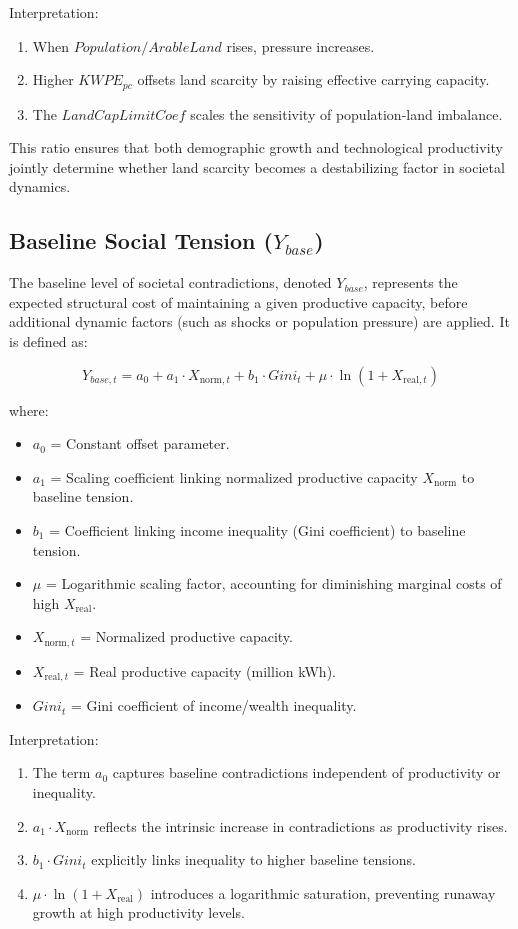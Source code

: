 \documentclass[12pt,a4paper]{article}
\begin{document}
\noindent Interpretation:
\begin{enumerate}
    \item When $Population/ArableLand$ rises, pressure increases.
    \item Higher $KWPE_{pc}$ offsets land scarcity by raising effective carrying capacity.
    \item The $LandCapLimitCoef$ scales the sensitivity of population-land imbalance.
\end{enumerate}

\noindent This ratio ensures that both demographic growth and technological 
productivity jointly determine whether land scarcity becomes a destabilizing 
factor in societal dynamics.
\subsection{Baseline Social Tension (\texorpdfstring{$Y_{base}$}{Ybase})}

The baseline level of societal contradictions, denoted $Y_{base}$, represents 
the expected structural cost of maintaining a given productive capacity, before 
additional dynamic factors (such as shocks or population pressure) are applied. 
It is defined as:

\begin{equation}
Y_{base,t} = a_0 + a_1 \cdot X_{\mathrm{norm},t} + b_1 \cdot Gini_t + \mu \cdot \ln(1 + X_{\mathrm{real},t})
\end{equation}

\noindent where:
\begin{itemize}
    \item $a_0$ = Constant offset parameter.
    \item $a_1$ = Scaling coefficient linking normalized productive capacity $X_{\mathrm{norm}}$ to baseline tension.
    \item $b_1$ = Coefficient linking income inequality (Gini coefficient) to baseline tension.
    \item $\mu$ = Logarithmic scaling factor, accounting for diminishing marginal costs of high $X_{\mathrm{real}}$.
    \item $X_{\mathrm{norm},t}$ = Normalized productive capacity.
    \item $X_{\mathrm{real},t}$ = Real productive capacity (million kWh).
    \item $Gini_t$ = Gini coefficient of income/wealth inequality.
\end{itemize}

\noindent Interpretation:
\begin{enumerate}
    \item The term $a_0$ captures baseline contradictions independent of productivity or inequality.
    \item $a_1 \cdot X_{\mathrm{norm}}$ reflects the intrinsic increase in contradictions as productivity rises.
    \item $b_1 \cdot Gini_t$ explicitly links inequality to higher baseline tensions.
    \item $\mu \cdot \ln(1 + X_{\mathrm{real}})$ introduces a logarithmic saturation, preventing runaway growth at high productivity levels.
\end{enumerate}
\end{document}
